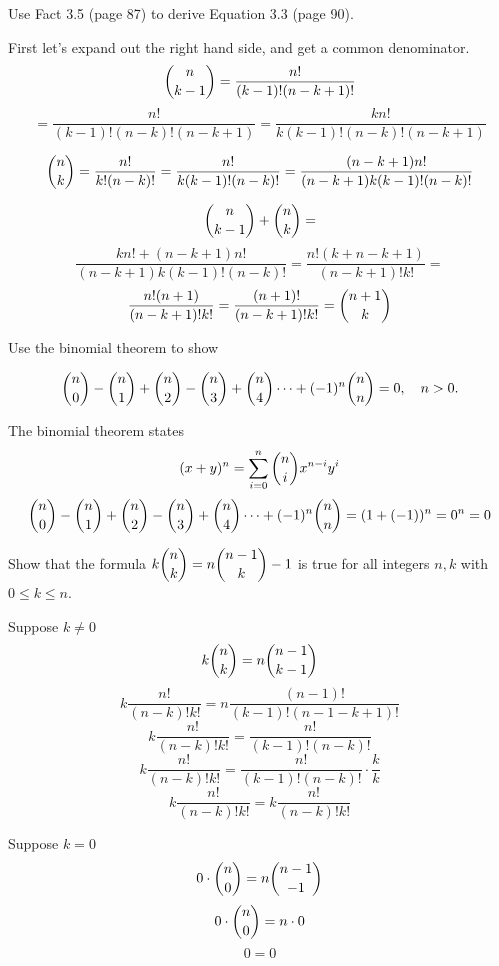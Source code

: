 \documentclass[openany, 12pt]{book}
\begin{document}
\begin{exercise}{}{}
	Use Fact 3.5 (page 87) to derive Equation 3.3 (page 90).
	\begin{alist}
		\item First let's expand out the right hand side, and get a common denominator.
		$$\dbinom{n}{k-1} =\dfrac{n!}{(k-1)!(n-k+1)!}$$
		$$=\dfrac{n!}{(k-1)!(n-k)!(n-k+1)} =\dfrac{kn!}{k(k-1)!(n-k)!(n-k+1)}$$

		$$\dbinom{n}{k}=\dfrac{n!}{k!(n-k)!}=
			\dfrac{n!}{k(k-1)!(n-k)!}=
			\dfrac{(n-k+1)n!}{(n-k+1)k(k-1)!(n-k)!}
		$$

		$$\dbinom{n}{k-1} + \dbinom{n}{k}=$$
		$$ \dfrac{kn!+(n-k+1)n!}{(n-k+1)k(k-1)!(n-k)!}=
			\dfrac{n!(k+n-k+1)}{(n-k+1)!k!}= $$
		$$ \dfrac{n!(n+1)}{(n-k+1)!k!}=
			\dfrac{(n+1)!}{(n-k+1)!k!}= \dbinom{n+1}{k}$$
	\end{alist}
\end{exercise}

\begin{exercise}{}{}
	Use the binomial theorem to show
	\begin{alist}
		\item
		$$
			\dbinom{n}{0}
			- \dbinom{n}{1}
			+ \dbinom{n}{2}
			- \dbinom{n}{3}
			+ \dbinom{n}{4}
			\dots
			+ (-1)^n\dbinom{n}{n} =0, \quad n>0.
		$$
		\item The binomial theorem states
		$$(x+y)^n=\sum\limits_{i=0}^n\dbinom{n}{i}x^{n-i}y^i$$
		$$
			\dbinom{n}{0}
			- \dbinom{n}{1}
			+ \dbinom{n}{2}
			- \dbinom{n}{3}
			+ \dbinom{n}{4}
			\dots
			+ (-1)^n\dbinom{n}{n}=(1+(-1))^n = 0^n = 0
		$$
	\end{alist}
\end{exercise}

\begin{exercise}{}{}
	Show that the formula $k\dbinom{n}{k}=n\dbinom{n-1}
		k-1$
	is true for all integers $n, k$ with $0 \leq k \leq n$.
	\begin{alist}
		\item Suppose $k\neq0$
		$$k\dbinom{n}{k}=n\dbinom{n-1}{k-1}$$
		$$k\dfrac{n!}{(n-k)!k!}=n\dfrac{(n-1)!}{(k-1)!(n-1-k+1)!}$$
		$$k\dfrac{n!}{(n-k)!k!}=\dfrac{n!}{(k-1)!(n-k)!}$$
		$$k\dfrac{n!}{(n-k)!k!}=\dfrac{n!}{(k-1)!(n-k)!}\cdot\dfrac{k}{k}$$
		$$k\dfrac{n!}{(n-k)!k!}=k\dfrac{n!}{(n-k)!k!}$$
		\item Suppose $k=0$
		$$0\cdot\dbinom{n}{0}=n\dbinom{n-1}{-1}$$
		$$0\cdot\dbinom{n}{0}=n\cdot 0$$
		$$0=0$$
	\end{alist}
\end{exercise}
\end{document}
